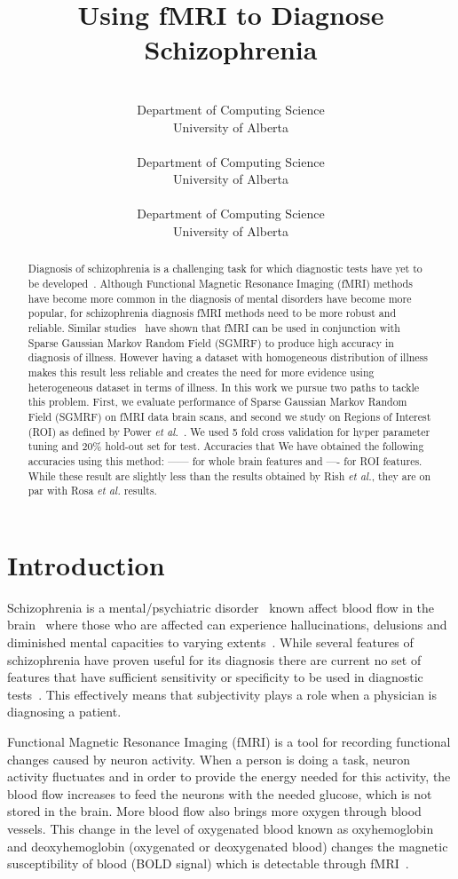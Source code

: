 \documentclass{article} %
\title{Using fMRI to Diagnose Schizophrenia}
\author{%
	\\
	Department of Computing Science\\
	University of Alberta\\
	\texttt{} 
\And 
 \\
Department of Computing Science\\
University of Alberta\\
\texttt{}
\And 
\\
Department of Computing Science\\
University of Alberta\\
\texttt{}  
}
\begin{document}
	\maketitle

\begin{abstract}
Diagnosis of schizophrenia is a challenging task for which diagnostic tests
have yet to be developed~\cite{McGuire200891}. Although Functional Magnetic 
Resonance Imaging (fMRI) methods have become more common in the diagnosis of 
mental disorders have become more popular, for schizophrenia diagnosis fMRI 
methods need to be more robust and reliable. Similar 
studies~\cite{Rish_2013}\cite{Rosa_2013} have shown that fMRI can be used in 
conjunction with Sparse Gaussian Markov Random Field (SGMRF) to produce high 
accuracy in diagnosis of illness.
However having a dataset with homogeneous distribution of illness makes this 
result less reliable and creates the need for more evidence using 
heterogeneous dataset in terms of illness. 
In this work we pursue two paths to tackle this problem. First, we evaluate 
performance of Sparse Gaussian Markov Random Field (SGMRF) on fMRI data 
brain scans, and second we study on Regions of Interest (ROI) as defined by
Power \emph{et al.}~\cite{Power_2011}. 
We used 5 fold cross validation for hyper parameter tuning and $20\%$ hold-out 
set for test. Accuracies that We have obtained the following accuracies using 
this method: —— for whole brain features and —- for ROI features. While these 
result are slightly less than the results obtained by Rish \emph{et al.}, 
they are on par with Rosa \emph{et al.} results.  
\end{abstract}


\section{Introduction}
Schizophrenia is a mental/psychiatric disorder~\cite{Rish_2013, Kenji_2010} 
known affect blood flow in the brain~\cite{Kenji_2010} where those who are 
affected can experience hallucinations, delusions and diminished mental 
capacities to varying extents~\cite{jablensky2010diagnostic}. While several
features of schizophrenia have proven useful for its diagnosis there are
current no set of features that have sufficient sensitivity or specificity
to be used in diagnostic tests~\cite{jablensky2010diagnostic}. This 
effectively means that subjectivity plays a role when a physician is 
diagnosing a patient. 

Functional Magnetic Resonance Imaging (fMRI) is a tool for recording 
functional changes caused by neuron activity\cite{}. When a person is doing a 
task, neuron activity fluctuates and in order to provide the energy 
needed for this activity, the blood flow increases to feed the neurons with 
the needed glucose, which is not stored in the brain\cite{}. More blood flow also 
brings more oxygen through blood vessels. This change in the level of 
oxygenated blood known as oxyhemoglobin and deoxyhemoglobin (oxygenated or 
deoxygenated blood) changes the magnetic susceptibility of blood (BOLD signal) 
which is detectable through fMRI~\cite{}.
\end{document}

